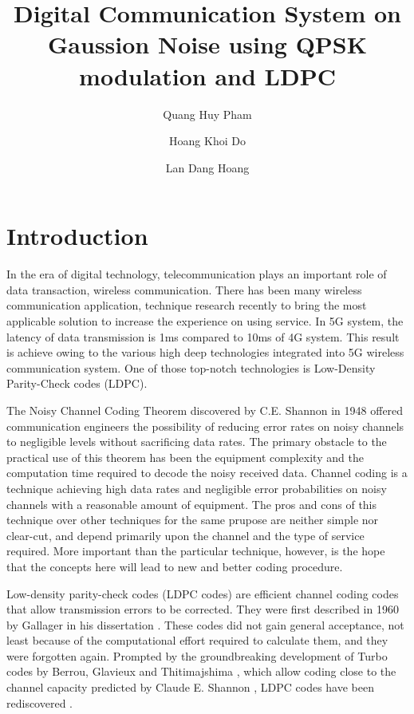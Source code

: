 \documentclass{article}
\author[1]{Quang Huy Pham \orcidaffil{0000-0000-0000-0000}}
\author[1]{Hoang Khoi Do \orcidaffil{0000-0000-0000-0000}}
\author[2]{Lan Dang Hoang \orcidaffil{0000-0000-0000-0000}}
\affil[1]{Author Affiliation1}
\affil[2]{Author Affiliation2}
\affil[ ]{\textit {\{huy.pq200282, khoi.dh200332, lan.dh203810\}@sis.hust.edu.vn}}
\begin{document}
	\title{Digital Communication System on Gaussion Noise using QPSK modulation and LDPC}	
	
	\maketitle
	
	\begin{abstract}
		
	\end{abstract}
	
	\section{Introduction}
	
	In the era of digital technology, telecommunication plays an important role of data transaction, wireless communication. There has been many wireless communication application, technique research recently to bring the most applicable solution to increase the experience on using service. In 5G system, the latency of data transmission is 1ms compared to 10ms of 4G system. This result is achieve owing to the various high deep technologies integrated into 5G wireless communication system. One of those top-notch technologies is Low-Density Parity-Check codes (LDPC).
	
	The Noisy Channel Coding Theorem discovered by C.E. Shannon in 1948 offered communication engineers the possibility of reducing error rates on noisy channels to negligible levels without sacrificing data rates. The primary obstacle to the practical use of this theorem has been the equipment complexity  and the computation time required to decode the noisy received data. Channel coding is a technique achieving high data rates and negligible error probabilities on noisy channels with a reasonable amount of equipment. The pros and cons of this technique over other techniques for the same prupose are neither simple nor clear-cut, and depend primarily upon the channel and the type of service required. More important than the particular technique, however, is the hope that the concepts here will lead to new and better coding procedure.
	
	Low-density parity-check codes (LDPC codes) are efficient channel coding codes
	that allow transmission errors to be corrected. They were first described in 1960 by	Gallager in his dissertation \cite{Gal63}. These codes did not gain general acceptance, not	least because of the computational effort required to calculate them, and they were forgotten again.	Prompted by the groundbreaking development of Turbo codes by Berrou, Glavieux and Thitimajshima \cite{Ber93}, which allow coding close to the channel capacity predicted by Claude E. Shannon \cite{Sha48}, LDPC codes have been rediscovered \cite{Mac96}.
	
\end{document}
